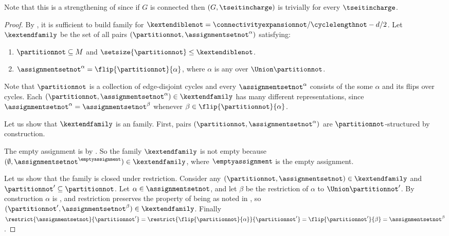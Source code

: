 \documentclass{toc}
\begin{document}
Note that this is a strengthening of  since if $G$ is connected then $(G,\tseitincharge)$ is trivially \Gnonsplitting for every $\tseitincharge$.

\begin{proof}
  By , it is sufficient to build \akextendible family for $\kextendiblenot = \connectivityexpansionnot / \cyclelengthnot - d/2$. Let $\kextendfamily$ be the set of all pairs $(\partitionnot,\assignmentsetnot^\alpha)$ satisfying:
  \begin{enumerate}
  \item $\partitionnot\subseteq M$ and $\setsize{\partitionnot}\leq \kextendiblenot$.
  \item $\assignmentsetnot^{\alpha}=\flip{\partitionnot}{\alpha}$, where $\alpha$ is any \nonsplittingassignment over $\Union \partitionnot$.
  \end{enumerate}
  Note that $\partitionnot$ is a collection of edge-disjoint cycles and every $\assignmentsetnot^\alpha$ consists of the some \nonsplittingassignment $\alpha$ and its flips over cycles. Each $(\partitionnot,\assignmentsetnot^{\alpha}) \in \kextendfamily$ has many different representations, since $\assignmentsetnot^{\alpha}=\assignmentsetnot^{\beta}$ whenever $\beta\in\flip{\partitionnot}{\alpha}$.

  Let us show that $\kextendfamily$ is an \kextendibleNok family. First, pairs $(\partitionnot,\assignmentsetnot^{\alpha})$ are $\partitionnot$-structured by construction.
  
  The empty assignment is \nonsplitting by . So the family $\kextendfamily$ is not empty because $(\emptyset,\assignmentsetnot^{\emptyassignment})\in\kextendfamily$, where $\emptyassignment$ is the empty assignment.

  Let us show that the family is closed under restriction. Consider any $(\partitionnot,\assignmentsetnot)\in\kextendfamily$ and $\partitionnot'\subseteq \partitionnot$. Let $\alpha\in\assignmentsetnot$, and let $\beta$ be the restriction of $\alpha$ to $\Union\partitionnot'$. By construction $\alpha$ is \nonsplitting, and restriction preserves the property of being \nonsplitting as noted in , so $(\partitionnot',\assignmentsetnot^{\beta})\in\kextendfamily$. Finally $\restrict{\assignmentsetnot}{\partitionnot'}=\restrict{\flip{\partitionnot}{\alpha}}{\partitionnot'}=\flip{\partitionnot'}{\beta}=\assignmentsetnot^{\beta}$.


\end{proof}
\end{document}
